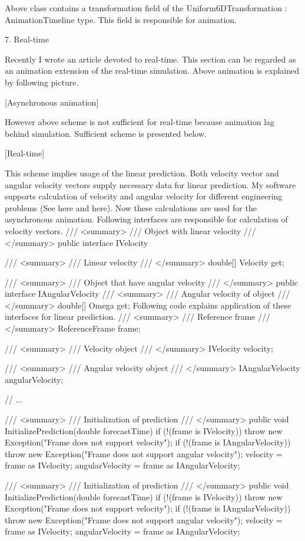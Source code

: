 \documentclass[10pt,journal,compsoc]{IEEEtran}
\begin{document}
Above class contains a transformation field of the {Uniform6DTransformation : AnimationTimeline} type. This field is responsible for animation.

7. Real-time

Recently I wrote an {article devoted to real-time}. This section can be regarded as an animation extension of the real-time simulation. Above animation is explained by following picture.

[Asynchronous animation]

However above scheme is not sufficient for real-time because animation lag behind simulation. Sufficient scheme is presented below.

[Real-time]

This scheme implies usage of the {linear prediction}. Both {velocity vector} and {angular velocity} vectors supply necessary data for linear prediction. My software supports calculation of velocity and angular velocity for different engineering problems (See {here} and {here}). Now these calculations are used for the asynchronous animation. Following interfaces are responsible for calculation of velocity vectors.
/// <summary>
/// Object with linear velocity
/// </summary>
public interface IVelocity
{
	/// <summary>
	/// Linear velocity
	/// </summary>
	double[] Velocity
	{
		get;
	}
	
}

/// <summary>
/// Object that have angular velocity
/// </summary>
public interface IAngularVelocity
{
	/// <summary>
	/// Angular velocity of object
	/// </summary>
	double[] Omega
	{
		get;
	}
}
Following code explains application of these interfaces for linear prediction.
/// <summary>
/// Reference frame
/// </summary>
ReferenceFrame frame;

/// <summary>
/// Velocity object
/// </summary>
IVelocity velocity;

/// <summary>
/// Angular velocity object
/// </summary>
IAngularVelocity angularVelocity;

// ...


/// <summary>
/// Initialization of prediction
/// </summary>
public void InitializePrediction(double forecastTime)
{
	if (!(frame is IVelocity))
	{
		throw new Exception("Frame does not support velocity");
	}
	if (!(frame is IAngularVelocity))
	{
		throw new Exception("Frame does not support angular velocity");
	}
	velocity = frame as IVelocity;
	angularVelocity = frame as IAngularVelocity;
}

/// <summary>
/// Initialization of prediction
/// </summary>
public void InitializePrediction(double forecastTime)
{
	if (!(frame is IVelocity))
	{
		throw new Exception("Frame does not support velocity");
	}
	if (!(frame is IAngularVelocity))
	{
		throw new Exception("Frame does not support angular velocity");
	}
	velocity = frame as IVelocity;
	angularVelocity = frame as IAngularVelocity;
}
\end{document}
